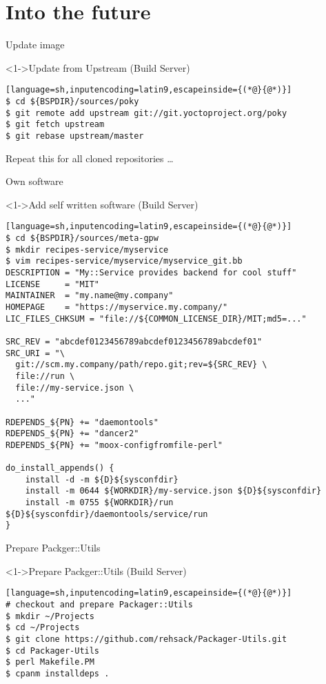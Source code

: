 \documentclass[ngerman,xcolor={table,dvipsnames},smaller,compress,hyperref={bookmarks,colorlinks},handout]{beamer}%
\begin{document}
\part{Into the future}

\begin{frame}[fragile]{Update image}
\begin{block}<1->{Update from Upstream (Build Server)}
\small
\begin{lstlisting}[language=sh,inputencoding=latin9,escapeinside={(*@}{@*)}]
$ cd ${BSPDIR}/sources/poky
$ git remote add upstream git://git.yoctoproject.org/poky
$ git fetch upstream
$ git rebase upstream/master
\end{lstlisting}
\end{block}

Repeat this for all cloned repositories \ldots
\end{frame}

\begin{frame}[fragile]{Own software}
\begin{block}<1->{Add self written software (Build Server)}
\scriptsize
\begin{lstlisting}[language=sh,inputencoding=latin9,escapeinside={(*@}{@*)}]
$ cd ${BSPDIR}/sources/meta-gpw
$ mkdir recipes-service/myservice
$ vim recipes-service/myservice/myservice_git.bb
DESCRIPTION = "My::Service provides backend for cool stuff"
LICENSE     = "MIT"
MAINTAINER  = "my.name@my.company"
HOMEPAGE    = "https://myservice.my.company/"
LIC_FILES_CHKSUM = "file://${COMMON_LICENSE_DIR}/MIT;md5=..."

SRC_REV = "abcdef0123456789abcdef0123456789abcdef01"
SRC_URI = "\
  git://scm.my.company/path/repo.git;rev=${SRC_REV} \
  file://run \
  file://my-service.json \
  ..."

RDEPENDS_${PN} += "daemontools"
RDEPENDS_${PN} += "dancer2"
RDEPENDS_${PN} += "moox-configfromfile-perl"

do_install_appends() {
    install -d -m ${D}${sysconfdir}
    install -m 0644 ${WORKDIR}/my-service.json ${D}${sysconfdir}
    install -m 0755 ${WORKDIR}/run ${D}${sysconfdir}/daemontools/service/run
}
\end{lstlisting}
\end{block}
\end{frame}

\begin{frame}[fragile]{Prepare Packger::Utils}
\begin{block}<1->{Prepare Packger::Utils (Build Server)}
\small
\begin{lstlisting}[language=sh,inputencoding=latin9,escapeinside={(*@}{@*)}]
# checkout and prepare Packager::Utils
$ mkdir ~/Projects
$ cd ~/Projects
$ git clone https://github.com/rehsack/Packager-Utils.git
$ cd Packager-Utils
$ perl Makefile.PM
$ cpanm installdeps .
\end{lstlisting}
\end{block}
\end{frame}
\end{document}
